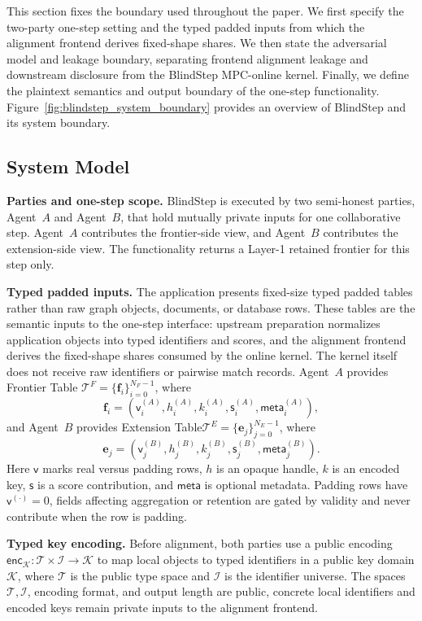 \documentclass[conference,compsoc,letterpaper]{IEEEtran}
\theoremstyle{definition}
\theoremstyle{remark}
\newcommand{\BlindStep}{BlindStep\xspace}
\newcommand{\FrontierTable}{\mathcal{T}^{F}}
\newcommand{\ExtensionTable}{\mathcal{T}^{E}}
\newcommand{\frontierrow}{\mathbf{f}}
\newcommand{\extensionrow}{\mathbf{e}}
\newcommand{\valid}{\mathsf{v}}
\newcommand{\score}{\mathsf{s}}
\begin{document}
This section fixes the boundary used throughout the paper.
We first specify the two-party one-step setting and the typed padded inputs from which the alignment frontend derives fixed-shape shares.
We then state the adversarial model and leakage boundary, separating frontend alignment leakage and downstream disclosure from the \BlindStep{} MPC-online kernel.
Finally, we define the plaintext semantics and output boundary of the one-step functionality.
Figure~\ref{fig:blindstep_system_boundary} provides an overview of \BlindStep{} and its system boundary.
\subsection{System Model}
\label{subsec:system_model}

\noindent\textbf{Parties and one-step scope.}
\BlindStep{} is executed by two semi-honest parties, Agent~$A$ and Agent~$B$, that hold mutually private inputs for one collaborative step.
Agent~$A$ contributes the frontier-side view, and Agent~$B$ contributes the extension-side view.
The functionality returns a Layer-1 retained frontier for this step only.

\smallskip
\noindent\textbf{Typed padded inputs.}
The application presents fixed-size typed padded tables rather than raw graph objects, documents, or database rows.
These tables are the semantic inputs to the one-step interface: upstream preparation normalizes application objects into typed identifiers and scores, and the alignment frontend derives the fixed-shape shares consumed by the online kernel.
The kernel itself does not receive raw identifiers or pairwise match records.
Agent~$A$ provides Frontier Table $\FrontierTable=\{\frontierrow_i\}_{i=0}^{N_F-1}$, where
\[
\frontierrow_i=(\valid_i^{(A)},h_i^{(A)},k_i^{(A)},
\score_i^{(A)},\mathsf{meta}_i^{(A)}),
\]
and Agent~$B$ provides Extension Table$\ExtensionTable=\{\extensionrow_j\}_{j=0}^{N_E-1}$, where
\[
\extensionrow_j=(\valid_j^{(B)},h_j^{(B)},k_j^{(B)},
\score_j^{(B)},\mathsf{meta}_j^{(B)}).
\]
Here $\valid$ marks real versus padding rows, $h$ is an opaque handle, $k$ is an encoded key, $\score$ is a score contribution, and $\mathsf{meta}$ is optional metadata.
Padding rows have $\valid^{(\cdot)}=0$, fields affecting aggregation or retention are gated by validity and never contribute when the row is padding.

\noindent\textbf{Typed key encoding.}
Before alignment, both parties use a public encoding $\mathsf{enc}_{\mathcal K}:\mathcal T\times\mathcal I\to\mathcal K$ to map local objects to typed identifiers in a public key domain
\(\mathcal K\), where \(\mathcal T\) is the public type space and
\(\mathcal I\) is the identifier universe. The spaces
\(\mathcal T,\mathcal I\), encoding format, and output length are public,
concrete local identifiers and encoded keys remain private inputs to the
alignment frontend.
\end{document}
